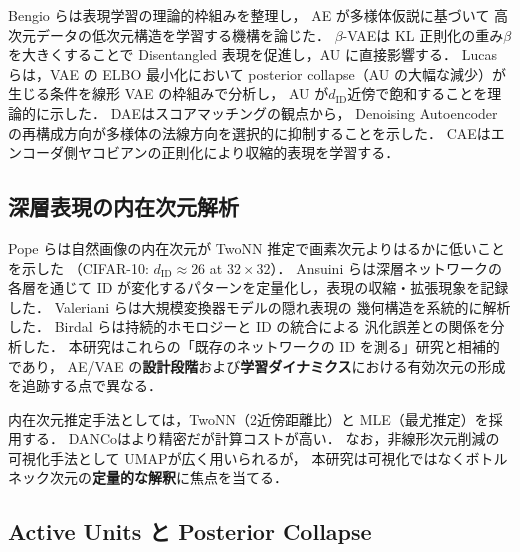 \documentclass[11pt,a4paper]{jsarticle}
\begin{document}
Bengio ら\cite{bengio2013representation}は表現学習の理論的枠組みを整理し，
AE が多様体仮説\cite{fefferman2016manifold}に基づいて
高次元データの低次元構造を学習する機構を論じた．
$\beta$-VAE\cite{higgins2017betavae}は KL 正則化の重み$\beta$を大きくすることで
Disentangled 表現を促進し，AU に直接影響する．
Lucas ら\cite{lucas2019elbo}は，VAE の ELBO 最小化において
posterior collapse（AU の大幅な減少）が生じる条件を線形 VAE の枠組みで分析し，
AU が$d_{\mathrm{ID}}$近傍で飽和することを理論的に示した．
DAE\cite{alain2014dae}はスコアマッチングの観点から，
Denoising Autoencoder の再構成方向が多様体の法線方向を選択的に抑制することを示した．
CAE\cite{rifai2011cae}はエンコーダ側ヤコビアンの正則化により収縮的表現を学習する．

\subsection{深層表現の内在次元解析}\label{sec:related_id}

Pope ら\cite{pope2021intrinsic}は自然画像の内在次元が
TwoNN 推定で画素次元よりはるかに低いことを示した
（CIFAR-10: $d_\mathrm{ID} \approx 26$ at $32 \times 32$）．
Ansuini ら\cite{ansuini2019intrinsic}は深層ネットワークの各層を通じて
ID が変化するパターンを定量化し，表現の収縮・拡張現象を記録した．
Valeriani ら\cite{valeriani2023geometry}は大規模変換器モデルの隠れ表現の
幾何構造を系統的に解析した．
Birdal ら\cite{birdal2021intrinsic}は持続的ホモロジーと ID の統合による
汎化誤差との関係を分析した．
本研究はこれらの「既存のネットワークの ID を測る」研究と相補的であり，
AE/VAE の\textbf{設計段階}および\textbf{学習ダイナミクス}における有効次元の形成を追跡する点で異なる．

内在次元推定手法としては，TwoNN\cite{facco2017twonn}（2近傍距離比）と
MLE\cite{levina2005mle}（最尤推定）を採用する．
DANCo\cite{ceruti2014danco}はより精密だが計算コストが高い．
なお，非線形次元削減の可視化手法として UMAP\cite{mcinnes2018umap}が広く用いられるが，
本研究は可視化ではなくボトルネック次元の\textbf{定量的な解釈}に焦点を当てる．

\subsection{Active Units と Posterior Collapse}\label{sec:related_au}
\end{document}
